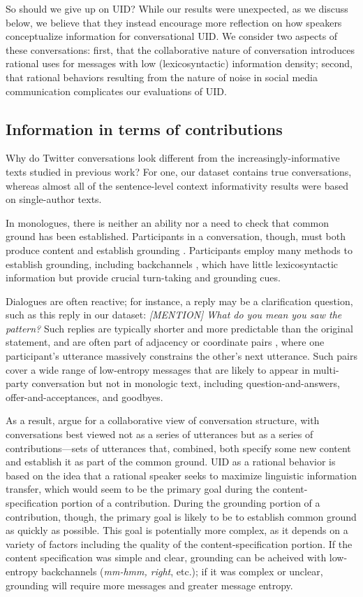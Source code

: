 \documentclass[11pt,letterpaper]{article}
\begin{document}
So should we give up on UID? While our results were unexpected, as we discuss below, we believe that they instead encourage more reflection on how speakers conceptualize information for conversational UID. We consider two aspects of these conversations: first, that the collaborative nature of conversation introduces rational uses for messages with low (lexicosyntactic) information density; second, that rational behaviors resulting from the nature of noise in social media communication complicates our evaluations of UID.

\subsection{Information in terms of contributions}

Why do Twitter conversations look different from the increasingly-informative texts studied in previous work? For one, our dataset contains true conversations, whereas almost all of the sentence-level context informativity results were based on single-author texts. 

In monologues, there is neither an ability nor a need to check that common ground has been established. Participants in a conversation, though, must both produce content and establish grounding \cite{clark1987}. Participants employ many methods to establish grounding, including backchannels \cite{yngve1970,schegloff1982,iwasaki1997}, which have little lexicosyntactic information but provide crucial turn-taking and grounding cues.

Dialogues are often reactive; for instance, a reply may be a clarification question, such as this reply in our dataset: {\it [MENTION] What do you mean you saw the pattern?}  Such replies are typically shorter and more predictable than the original statement, and are often part of adjacency or coordinate pairs \cite{schegloff1973,clark1981}, where one participant's utterance massively constrains the other's next utterance. Such pairs cover a wide range of low-entropy messages that are likely to appear in multi-party conversation but not in monologic text, including question-and-answers, offer-and-acceptances, and goodbyes.

As a result,  argue for a collaborative view of conversation structure, with conversations best viewed not as a series of utterances but as a series of contributions---sets of utterances that, combined, both specify some new content and establish it as part of the common ground.  UID as a rational behavior is based on the idea that a rational speaker seeks to maximize linguistic  information transfer, which would seem to be the primary goal during the content-specification portion of a contribution.  During the grounding portion of a contribution, though, the primary goal is likely to be to establish common ground as quickly as possible.  This goal is potentially more complex, as it depends on a variety of factors including the quality of the content-specification portion.  If the content specification was simple and clear, grounding can be acheived with low-entropy backchannels ({\it mm-hmm, right}, etc.); if it was complex or unclear, grounding will require more messages and greater message entropy.
\end{document}
